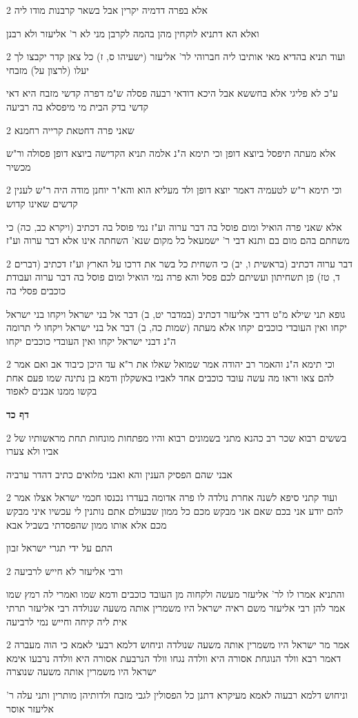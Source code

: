 \documentclass[12pt, openany]{book}
\newcommand{\sethebfont}{
\fontsize{10.5pt}{21.0pt} \selectfont
}
\newcommand{\twocol}[1]{
	{\sethebfont \begin{multicols}{2}
			#1
	\end{multicols}}	
}
\newcommand{\sectname}{}
\newcommand{\newsection}[1]{
	\addcontentsline{toc}{section}{#1}
	\renewcommand{\sectname}{#1}	
	\vspace{-\baselineskip}
	\begin{center}
		\textbf{%
\fontsize{16pt}{16pt}\selectfont
			#1}
	\end{center}
	\vspace{-\baselineskip}
	\nopagebreak
}
\begin{document}
\twocol{אלא בפרה דדמיה יקרין אבל בשאר קרבנות מודו ליה
\par ואלא הא דתניא לוקחין מהן בהמה לקרבן מני לא ר' אליעזר ולא רבנן}
\twocol{ועוד תניא בהדיא מאי אותיבו ליה חברוהי לר' אליעזר (ישעיהו ס, ז) כל צאן קדר יקבצו לך יעלו (לרצון על) מזבחי
\par ע"כ לא פליגי אלא בחששא אבל היכא דודאי רבעה פסלה ש"מ דפרה קדשי מזבח היא דאי קדשי בדק הבית מי מיפסלא בה רביעה}
\twocol{שאני פרה דחטאת קרייה רחמנא
\par אלא מעתה תיפסל ביוצא דופן וכי תימא ה"נ אלמה תניא הקדישה ביוצא דופן פסולה ור"ש מכשיר}
\twocol{וכי תימא ר"ש לטעמיה דאמר יוצא דופן ולד מעליא הוא והא"ר יוחנן מודה היה ר"ש לענין קדשים שאינו קדוש
\par אלא שאני פרה הואיל ומום פוסל בה דבר ערוה וע"ז נמי פוסל בה דכתיב (ויקרא כב, כה) כי משחתם בהם מום בם ותנא דבי ר' ישמעאל כל מקום שנא' השחתה אינו אלא דבר ערוה וע"ז}
\twocol{דבר ערוה דכתיב (בראשית ו, יב) כי השחית כל בשר את דרכו על הארץ וע"ז דכתיב (דברים ד, טז) פן תשחיתון ועשיתם לכם פסל והא פרה נמי הואיל ומום פוסל בה דבר ערוה ועבודת כוכבים פסלי בה
\par גופא תני שילא מ"ט דרבי אליעזר דכתיב (במדבר יט, ב) דבר אל בני ישראל ויקחו בני ישראל יקחו ואין העובדי כוכבים יקחו אלא מעתה (שמות כה, ב) דבר אל בני ישראל ויקחו לי תרומה ה"נ דבני ישראל יקחו ואין העובדי כוכבים יקחו}
\twocol{וכי תימא ה"נ והאמר רב יהודה אמר שמואל שאלו את ר"א עד היכן כיבוד אב ואם אמר להם צאו וראו מה עשה עובד כוכבים אחד לאביו באשקלון ודמא בן נתינה שמו פעם אחת בקשו ממנו אבנים לאפוד}
\newsection{דף כד}
\twocol{בששים רבוא שכר רב כהנא מתני בשמונים רבוא והיו מפתחות מונחות תחת מראשותיו של אביו ולא צערו
\par אבני שהם הפסיק הענין והא ואבני מלואים כתיב דהדר ערביה}
\twocol{ועוד קתני סיפא לשנה אחרת נולדה לו פרה אדומה בעדרו נכנסו חכמי ישראל אצלו אמר להם יודע אני בכם שאם אני מבקש מכם כל ממון שבעולם אתם נותנין לי עכשיו איני מבקש מכם אלא אותו ממון שהפסדתי בשביל אבא
\par התם על ידי תגרי ישראל זבון}
\twocol{ורבי אליעזר לא חייש לרביעה
\par והתניא אמרו לו לר' אליעזר מעשה ולקחוה מן העובד כוכבים ודמא שמו ואמרי לה רמץ שמו אמר להן רבי אליעזר משם ראיה ישראל היו משמרין אותה משעה שנולדה רבי אליעזר תרתי אית ליה קיחה וחייש נמי לרביעה}
\twocol{אמר מר ישראל היו משמרין אותה משעה שנולדה וניחוש דלמא רבעי לאמא כי הוה מעברה דאמר רבא וולד הנוגחת אסורה היא וולדה נגחו וולד הנרבעת אסורה היא וולדה נרבעו אימא ישראל היו משמרין אותה משעה שנוצרה
\par וניחוש דלמא רבעוה לאמא מעיקרא דתנן כל הפסולין לגבי מזבח ולדותיהן מותרין ותני עלה ר' אליעזר אוסר}
\end{document}
